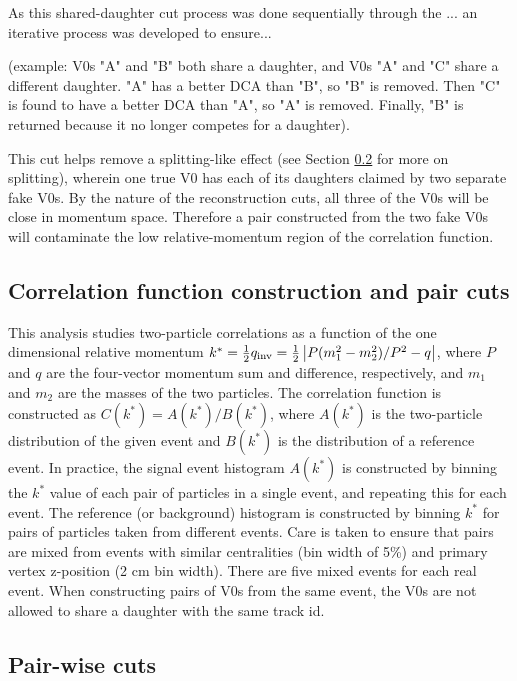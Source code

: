 As this shared-daughter cut process was done sequentially through the ... an iterative process was developed to ensure... 

(example: V0s "A" and "B" both share a daughter, and V0s "A" and "C" share a different daughter.  "A" has a better DCA than "B", so "B" is removed.  Then "C" is found to have a better DCA than "A", so "A" is removed.  Finally, "B" is returned because it no longer competes for a daughter).

This cut helps remove a splitting-like effect (see Section \ref{sec:PairWiseCuts} for more on splitting), wherein one true V0 has each of its daughters claimed by two separate fake V0s.  By the nature of the reconstruction cuts, all three of the V0s will be close in momentum space.  Therefore a pair constructed from the two fake V0s will contaminate the low relative-momentum region of the correlation function.  


\subsection{Correlation function construction and pair cuts}
\label{sec:CFconstruct}

This analysis studies two-particle correlations as a function of the one dimensional relative momentum $k^*=\frac{1}{2}q_{\mathrm{inv}}=\frac{1}{2}\left\lvert P(m^2_1-m^2_2)/P^2 - q\right\rvert$, where $P$ and $q$ are the four-vector momentum sum and difference, respectively, and $m_1$ and $m_2$ are the masses of the two particles.  The correlation function is constructed as $C(k^*) = A(k^*)/B(k^*)$, where $A(k^*)$ is the two-particle distribution of the given event and $B(k^*)$ is the distribution of a reference event.  In practice, the signal event histogram $A(k^*)$ is constructed by binning the $k^*$ value of each pair of particles in a single event, and repeating this for each event.  The reference (or background) histogram is constructed by binning $k^*$ for pairs of particles taken from different events.  Care is taken to ensure that pairs are mixed from events with similar centralities (bin width of 5\%) and primary vertex z-position (2 cm bin width).  There are five mixed events for each real event.  When constructing pairs of V0s from the same event, the V0s are not allowed to share a daughter with the same track id. 

\subsection{Pair-wise cuts}
\label{sec:PairWiseCuts}

